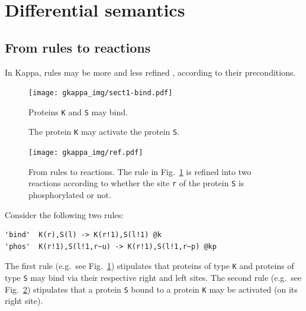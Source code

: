 \documentclass[11pt]{book}
\begin{document}
\section{Differential semantics}
\label{sec:differential semantics}

\subsection{From rules to reactions}

In Kappa, rules may be more and less refined \cite{DanosFFHK08,DBLP:journals/tcsb/DanosFFHK09}, according to their preconditions.

\begin{figure}[t]
\begin{minipage}{\linewidth}
    \centering\scalebox{0.7}%
    {\texttt{[image: gkappa\_img/sect1-bind.pdf]}}
  \end{minipage}
  \caption{Proteins \texttt{K} and \texttt{S} may bind.}
  \label{fig:sec1:bind}
\end{figure}
\begin{figure}[t]
\begin{minipage}{\linewidth}
\centering{}
\end{minipage}
\caption{The protein \texttt{K} may activate the protein \texttt{S}.}
\label{fig:sec1:phos}
\end{figure}
\begin{figure}[t]
\centering\hspace*{5mm}\texttt{[image: gkappa\_img/ref.pdf]}
  \caption{From rules to reactions. The rule in Fig.~\ref{fig:sec1:bind} is refined into two reactions according to whether the site \texttt{r} of the protein \texttt{S} is phosphorylated or not.}
  \label{fig:refinement}
\end{figure}

Consider the following two rules:
\begin{lstlisting}[language=kappa]
'bind'  K(r),S(l) -> K(r!1),S(l!1) @k
'phos'  K(r!1),S(l!1,r~u) -> K(r!1),S(l!1,r~p) @kp
\end{lstlisting}




 The first rule (e.g.~see Fig.~\ref{fig:sec1:bind}) stipulates that proteins of type \texttt{K} and proteins of type \texttt{S} may bind via their respective right and left sites. The second rule (e.g.~see Fig.~\ref{fig:sec1:phos})  stipulates that a protein \texttt{S} bound to a protein \texttt{K} may be activated (on its right site).
\end{document}
